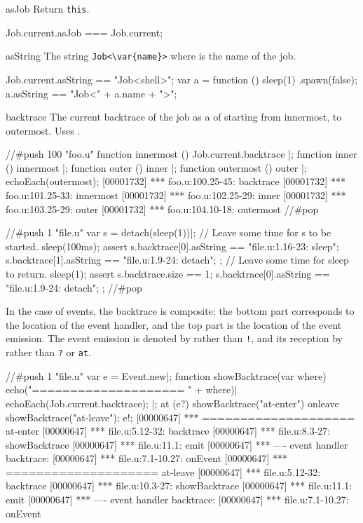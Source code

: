\begin{urbiscriptapi}
\item[asJob]
  Return \lstinline|this|.
\begin{urbiassert}
Job.current.asJob === Job.current;
\end{urbiassert}


\item[asString] The string \lstinline|Job<\var{name}>| where  is
  the name of the job.
\begin{urbiassert}
Job.current.asString == "Job<shell>";
var a = function () { sleep(1) }.spawn(false);
a.asString == "Job<" + a.name + ">";
\end{urbiassert}


\item[backtrace] The current backtrace of the job as a  of
   starting from innermost, to outermost.
  Uses .

\begin{urbiscript}
//#push 100 "foo.u"
function innermost () { Job.current.backtrace }|;
function inner ()     { innermost }|;
function outer ()     { inner }|;
function outermost () { outer }|;
echoEach(outermost);
[00001732] *** foo.u:100.25-45: backtrace
[00001732] *** foo.u:101.25-33: innermost
[00001732] *** foo.u:102.25-29: inner
[00001732] *** foo.u:103.25-29: outer
[00001732] *** foo.u:104.10-18: outermost
//#pop

//#push 1 "file.u"
var s = detach(sleep(1))|;
// Leave some time for s to be started.
sleep(100ms);
assert
{
  s.backtrace[0].asString == "file.u:1.16-23: sleep";
  s.backtrace[1].asString == "file.u:1.9-24: detach";
};
// Leave some time for sleep to return.
sleep(1);
assert
{
  s.backtrace.size == 1;
  s.backtrace[0].asString == "file.u:1.9-24: detach";
};
//#pop
\end{urbiscript}

  In the case of events, the backtrace is composite: the bottom part
  corresponds to the location of the event handler, and the top part is the
  location of the event emission.  The event emission is denoted by
   rather than \lstinline|!|, and its reception by
   rather than \lstinline|?| or \lstinline|at|.

\begin{urbiscript}
//#push 1 "file.u"
var e = Event.new|;
function showBacktrace(var where)
{
  echo("==================== " + where)|
  echoEach(Job.current.backtrace);
}|;
at (e?)
  showBacktrace("at-enter")
onleave
  showBacktrace("at-leave");
e!;
[00000647] *** ==================== at-enter
[00000647] *** file.u:5.12-32: backtrace
[00000647] *** file.u:8.3-27: showBacktrace
[00000647] *** file.u:11.1: emit
[00000647] *** ---- event handler backtrace:
[00000647] *** file.u:7.1-10.27: onEvent
[00000647] *** ==================== at-leave
[00000647] *** file.u:5.12-32: backtrace
[00000647] *** file.u:10.3-27: showBacktrace
[00000647] *** file.u:11.1: emit
[00000647] *** ---- event handler backtrace:
[00000647] *** file.u:7.1-10.27: onEvent



\end{urbiscript}
\end{urbiscriptapi}
